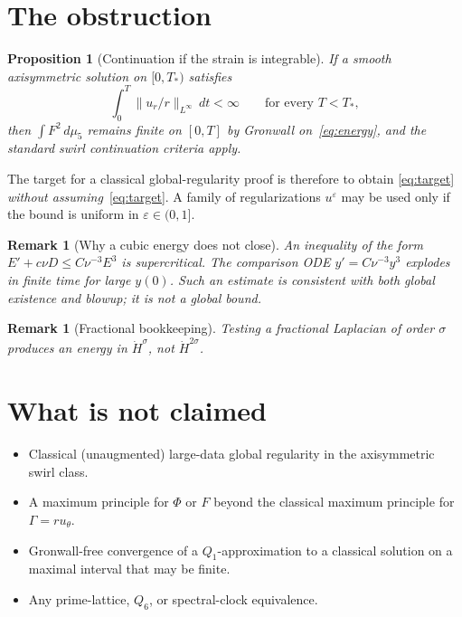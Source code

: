 \documentclass[11pt]{article}
\newtheorem{proposition}[theorem]{Proposition}
\newtheorem{remark}[theorem]{Remark}
\newcommand{\eps}{\varepsilon}
\newcommand{\norm}[2]{\|#1\|_{#2}}
\begin{document}
\section{The obstruction}

\begin{proposition}[Continuation if the strain is integrable]
If a smooth axisymmetric solution on \([0,T_*)\) satisfies
\begin{equation}\label{eq:target}
  \int_0^{T} \norm{u_r/r}{L^\infty}\,dt<\infty
  \qquad\text{for every }T<T_*,
\end{equation}
then \(\int F^2\,d\mu_5\) remains finite on \([0,T]\) by Gronwall
on~\eqref{eq:energy}, and the standard swirl continuation criteria apply.
\end{proposition}

The target for a classical global-regularity proof is therefore to obtain
\eqref{eq:target} \emph{without assuming}~\eqref{eq:target}.
A family of regularizations \(u^\eps\) may be used only if the bound is
uniform in \(\eps\in(0,1]\).

\begin{remark}[Why a cubic energy does not close]
An inequality of the form \(E'+c\nu D\le C\nu^{-3}E^3\) is supercritical.
The comparison ODE \(y'=C\nu^{-3}y^3\) explodes in finite time for large \(y(0)\).
Such an estimate is consistent with both global existence and blowup; it is
not a global bound.
\end{remark}

\begin{remark}[Fractional bookkeeping]
Testing a fractional Laplacian of order \(\sigma\) produces an energy in
\(\dot H^{\sigma}\), not \(\dot H^{2\sigma}\).
\end{remark}

\section{What is not claimed}

\begin{itemize}[leftmargin=1.2em]
\item Classical (unaugmented) large-data global regularity in the
axisymmetric swirl class.
\item A maximum principle for \(\Phi\) or \(F\) beyond the classical
maximum principle for \(\Gamma=ru_\theta\).
\item Gronwall-free convergence of a \(Q_1\)-approximation to a
classical solution on a maximal interval that may be finite.
\item Any prime-lattice, \(Q_6\), or spectral-clock equivalence.
\end{itemize}
\end{document}
